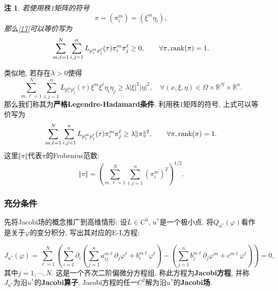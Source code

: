 \documentclass[12pt,a4paper]{article}
\newtheorem{remark}[theorem]{注}
\begin{document}
\begin{remark}
    若使用秩1矩阵的符号
\begin{equation*}
    \pi = (\pi_i^m) = (\xi^m\eta_i), 
\end{equation*}
那么\eqref{17}可以等价写为 
\begin{equation*}
    \sum_{m, \ell = 1}^N\sum_{i, j = 1}^nL_{p_i^mp_j^\ell}(\tau)\pi_i^m\pi_j^\ell \geq 0, \qquad \forall \pi, {\rm rank}(\pi) = 1.
\end{equation*}
\end{remark}

类似地, 若存在$\lambda > 0$使得 
\begin{equation*}
    \boxed{\sum_{m, \ell = 1}^N\sum_{i, j = 1}^nL_{p_i^mp_j^\ell}(\tau)\xi^m\xi^\ell\eta_i\eta_j \geq \lambda|\xi|^2|\eta|^2, \quad \forall (x, \xi, \eta) \in \Omega \times \mathbb{R}^N \times \mathbb{R}^n.}
\end{equation*}
那么我们称其为\textbf{严格Legendre-Hadamard条件}. 利用秩1矩阵的符号, 上式可以等价写为 
\begin{equation*}
    \sum_{m, \ell = 1}^N\sum_{i, j = 1}^nL_{p_i^mp_j^\ell}(\tau)\pi_i^m\pi_j^\ell \geq \lambda\Vert \pi\Vert^2, \qquad \forall \pi, {\rm rank}(\pi) = 1. 
\end{equation*}
这里$\Vert \pi\Vert$代表$\pi$的Frobenius范数:
\begin{equation*}
    \Vert \pi \Vert = \left(\sum_{m, \ell = 1}^N\sum_{i, j = 1}^n(\pi_i^m)^2\right)^{1/2}.
\end{equation*}

\subsubsection{充分条件}

先将Jacobi场的概念推广到高维情形: 设$L \in C^3$, $u^*$是一个极小点. 将$Q_{u^*}(\varphi)$看作是关于$\varphi$的变分积分, 写出其对应的E-L方程:

\begin{equation*}
    \boxed{J_{u^*}(\varphi) = \sum_{\ell = 1}^N\left(\sum_{i = 1}^n\partial_i\left(\sum_{j = 1}^na_{ij}^{m\ell}\partial_j\varphi^\ell + b_i^{m\ell}\varphi^\ell\right) - \left(\sum_{j = 1}^nb_j^{m\ell}\partial_j\varphi^m + c^{m\ell}\varphi^\ell\right)\right) = 0,}
\end{equation*}
其中$j = 1, \cdots, N$. 这是一个齐次二阶偏微分方程组. 称此方程为\textbf{Jacobi方程}, 并称$J_{u^*}$为沿$u^*$的\textbf{Jacobi算子}.
Jacobi方程的任一$C^2$解为沿$u^*$的\textbf{Jacobi场}.
\end{document}
